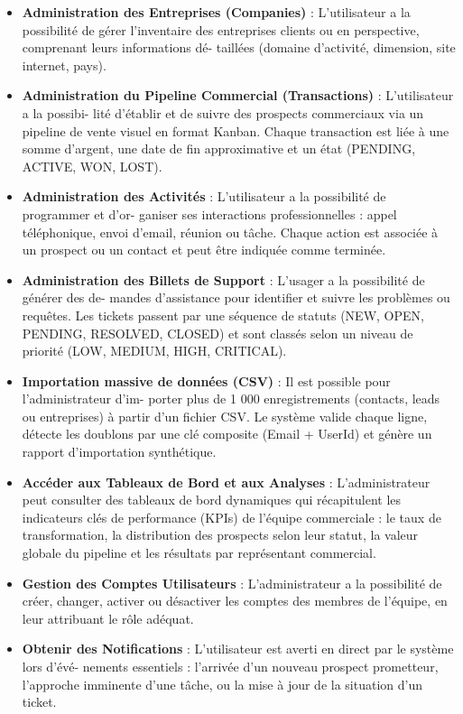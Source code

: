\begin{itemize}
    \item \textbf{Administration des Entreprises (Companies)} : L’utilisateur a la possibilité de gérer l’inventaire des entreprises clients ou en perspective, comprenant leurs informations dé-
    taillées (domaine d’activité, dimension, site internet, pays).
    
    \item \textbf{Administration du Pipeline Commercial (Transactions)} : L’utilisateur a la possibi-
    lité d’établir et de suivre des prospects commerciaux via un pipeline de vente visuel en format Kanban. Chaque transaction est liée à une somme d’argent, une date de fin approximative et un état (PENDING, ACTIVE, WON, LOST).
    
    \item \textbf{Administration des Activités} : L’utilisateur a la possibilité de programmer et d’or-
    ganiser ses interactions professionnelles : appel téléphonique, envoi d’email, réunion ou tâche. Chaque action est associée à un prospect ou un contact et peut être indiquée comme terminée.
    
    \item \textbf{Administration des Billets de Support} : L’usager a la possibilité de générer des de-
    mandes d’assistance pour identifier et suivre les problèmes ou requêtes. Les tickets passent par une séquence de statuts (NEW, OPEN, PENDING, RESOLVED, CLOSED) et sont classés selon un niveau de priorité (LOW, MEDIUM, HIGH, CRITICAL).
    
    \item \textbf{Importation massive de données (CSV)} : Il est possible pour l’administrateur d’im-
    porter plus de 1 000 enregistrements (contacts, leads ou entreprises) à partir d’un fichier CSV. Le système valide chaque ligne, détecte les doublons par une clé composite (Email + UserId) et génère un rapport d’importation synthétique.
    
    \item \textbf{Accéder aux Tableaux de Bord et aux Analyses} : L’administrateur peut consulter des tableaux de bord dynamiques qui récapitulent les indicateurs clés de performance (KPIs) de l’équipe commerciale : le taux de transformation, la distribution des prospects selon leur statut, la valeur globale du pipeline et les résultats par représentant commercial.
    
    \item \textbf{Gestion des Comptes Utilisateurs} : L’administrateur a la possibilité de créer, changer, activer ou désactiver les comptes des membres de l’équipe, en leur attribuant le rôle adéquat.
    
    \item \textbf{Obtenir des Notifications} : L’utilisateur est averti en direct par le système lors d’évé-
    nements essentiels : l’arrivée d’un nouveau prospect prometteur, l’approche imminente d’une tâche, ou la mise à jour de la situation d’un ticket.
\end{itemize}


